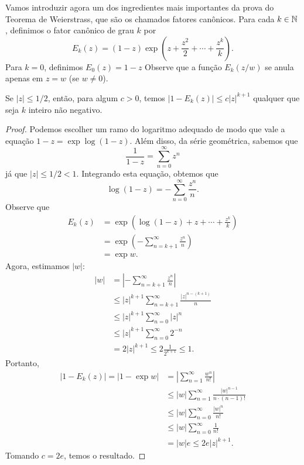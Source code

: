     
    Vamos introduzir agora um dos ingredientes mais importantes da prova
    do Teorema de Weierstrass, que são os chamados fatores canônicos. 
    Para cada $k \in \mathbb{N}$, definimos 
    o fator canônico de grau $k$ por
    \[
    E_k(z) = (1-z)\exp{\left(z + \frac{z^2}{2} + \cdots + \frac{z^k}{k}\right)}.
    \]
    Para $k=0$, definimos $E_0(z) = 1-z$ Observe que a 
    função $E_k(z/w)$ se anula apenas em $z = w$ (se $w \neq 0$). 
    \begin{lema}
    \label{lema-wstr-est-factor}
    Se $|z| \leq 1/2$, então, para algum $c>0$, 
    temos $|1-E_k(z)| \leq c|z|^{k+1}$ qualquer 
    que seja $k$ inteiro não negativo.
    \end{lema}
    \begin{proof}
    Podemos escolher um ramo do logaritmo adequado 
    de modo que vale a equação $1-z = \exp{\log(1-z)}$. 
    Além disso, da série geométrica, sabemos que 
    \[
    \frac{1}{1-z} = \sum_{n=0}^{\infty}z^n 
    \]
    já que $|z| \leq 1/2 < 1$. Integrando esta equação, obtemos que
    \[ 
    \log(1-z) = - \sum_{n=0}^{\infty}\frac{z^n}{n}.
    \]
    Observe que 
    \begin{align*}
        E_k(z) &= \exp{\left(\log(1-z) + z + \cdots + \frac{z^k}{k}\right)} \\
        &= \exp\left(-\sum_{n=k+1}^{\infty}\frac{z^n}{n}\right) \\
        &= \exp{w}.
    \end{align*}
    Agora, estimamos $|w|$:
    \begin{align*}
        |w| &= \left | -\sum_{n=k+1}^{\infty}\frac{z^n}{n} \right | \\
        &\leq |z|^{k+1}\sum_{n=k+1}^{\infty}\frac{|z|^{n - (k+1)}}{n} \\
        &\leq |z|^{k+1}\sum_{n=0}^{\infty}|z|^n \\
        &\leq |z|^{k+1}\sum_{n=0}^{\infty} 2^{-n} \\
        &= 2|z|^{k+1} \leq 2 \frac{1}{2^{k+1}} \leq 1.
    \end{align*}
    Portanto,
    \begin{align*}
        |1 - E_k(z)| = |1 - \exp{w}| 
        &= \left | \sum_{n=1}^{\infty}\frac{w^n}{n!} \right | \\
        &\leq |w|\sum_{n=1}^{\infty}\frac{|w|^{n-1}}{n\cdot (n-1)!} \\
        &\leq |w|\sum_{n=0}^{\infty}\frac{|w|^n}{n!} \\
        &\leq |w|\sum_{n=0}^{\infty}\frac{1}{n!} \\
        &=|w|e \leq 2e|z|^{k+1}.
    \end{align*}
    Tomando $c = 2e$, temos o resultado.
    \end{proof}
    
